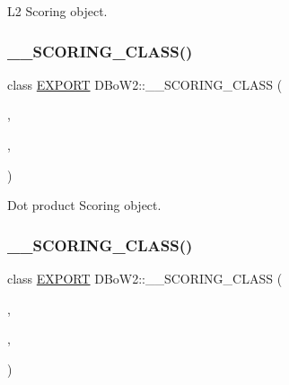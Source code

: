 L2 Scoring object. 

\mbox{\label{namespace_d_bo_w2_a8b3715c76bccab82aa18804b6b7dc1ba}} 
\subsubsection{\texorpdfstring{\+\_\+\+\_\+\+S\+C\+O\+R\+I\+N\+G\+\_\+\+C\+L\+A\+S\+S()}{\_\_SCORING\_CLASS()}\hspace{0.1cm}{\footnotesize\ttfamily [3/6]}}
{\footnotesize\ttfamily class \mbox{\hyperlink{config_8h_a3472d8cdbb788d5f1815b3522595bc49}{E\+X\+P\+O\+RT}} D\+Bo\+W2\+::\+\_\+\+\_\+\+S\+C\+O\+R\+I\+N\+G\+\_\+\+C\+L\+A\+SS (\begin{DoxyParamCaption}\item[{Dot\+Product\+Scoring}]{,  }\item[{false}]{,  }\item[{\mbox{\hyperlink{namespace_d_bo_w2_a53e9e0bcfc25c861815e413a7cf3fa51a94f5879ff083c0a8364805ae4f9c2d5c}{L1}}}]{ }\end{DoxyParamCaption})}



Dot product Scoring object. 

\mbox{\label{namespace_d_bo_w2_a7135fab6a887afb7d2b4e6254b4875ea}} 
\subsubsection{\texorpdfstring{\+\_\+\+\_\+\+S\+C\+O\+R\+I\+N\+G\+\_\+\+C\+L\+A\+S\+S()}{\_\_SCORING\_CLASS()}\hspace{0.1cm}{\footnotesize\ttfamily [4/6]}}
{\footnotesize\ttfamily class \mbox{\hyperlink{config_8h_a3472d8cdbb788d5f1815b3522595bc49}{E\+X\+P\+O\+RT}} D\+Bo\+W2\+::\+\_\+\+\_\+\+S\+C\+O\+R\+I\+N\+G\+\_\+\+C\+L\+A\+SS (\begin{DoxyParamCaption}\item[{Bhattacharyya\+Scoring}]{,  }\item[{true}]{,  }\item[{\mbox{\hyperlink{namespace_d_bo_w2_a53e9e0bcfc25c861815e413a7cf3fa51a94f5879ff083c0a8364805ae4f9c2d5c}{L1}}}]{ }\end{DoxyParamCaption})}



